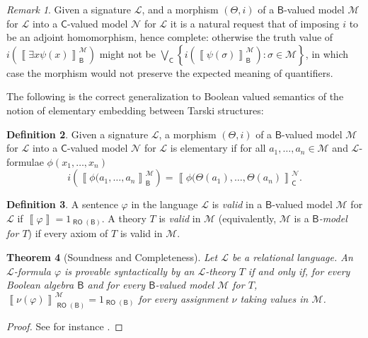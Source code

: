 \documentclass[11pt]{amsart}
\newcommand{\nphi}{\varphi}
\newcommand{\LL}{\mathcal{L}}
\theoremstyle{plain}
\newtheorem{theorem}{Theorem}[section]
\theoremstyle{definition}
\newtheorem{definition}[theorem]{Definition}
\theoremstyle{plain}
\theoremstyle{remark}
\newtheorem{remark}[theorem]{Remark}
\newcommand{\N}{\mathcal{N}}
\newcommand{\M}{\mathcal{M}}
\DeclareMathOperator{\RO}{\mathsf{RO}}
\newcommand{\bool}[1]{\mathsf{#1}}
\newcommand{\cp}[1]{\left( #1 \right)}
\newcommand{\Qp}[1]{\left\llbracket #1 \right\rrbracket}
\newcommand{\bp}[1]{\left\lbrace #1 \right\rbrace}
\newcommand{\0}{\mathsf{0}}
\renewcommand{\1}{\mathsf{1}}
\renewcommand{\2}{\mathsf{2}}
\theoremstyle{definition}
\begin{document}
\begin{remark}
Given a signature $\mathcal{L}$,
and a morphism $(\Theta,i)$ of a $\bool{B}$-valued model $\M$ for $\mathcal{L}$ into a $\bool{C}$-valued model $\N$ for $\mathcal{L}$
it is a natural request that of imposing $i$ to be an adjoint homomorphism, hence complete: otherwise the truth value of $i\cp{\Qp{\exists x\psi(x)}^\M_{\bool{B}}}$ might not be $\bigvee_{\bool{C}}\bp{i\cp{\Qp{\psi(\sigma)}^\M_\bool{B}}: \sigma\in\M}$, in which case the morphism would not preserve the expected meaning of quantifiers.
\end{remark}

The following is the correct generalization to Boolean valued semantics of the notion of elementary embedding between Tarski structures:
\begin{definition}\label{def:elembvm}
Given a signature $\mathcal{L}$,
a morphism $(\Theta,i)$ of a $\bool{B}$-valued model $\M$ for $\mathcal{L}$ into a $\bool{C}$-valued model $\N$
for $\mathcal{L}$ is elementary if for all $a_1,\dots,a_n\in\M$ and $\mathcal{L}$-formulae $\phi(x_1,\dots,x_n)$
\[
i(\Qp{\phi(a_1,\dots,a_n}^\M_\bool{B})=\Qp{\phi(\Theta(a_1),\dots,\Theta(a_n)}^\N_\bool{C}.
\]
\end{definition}


\begin{definition}
A sentence $\nphi$ in the language $\LL$ is \emph{valid} in a $\bool{B}$-valued model $\M$ for $\LL$ if $\Qp{\nphi}=1_{\RO(\bool{B})}$. 
A theory $T$ is \emph{valid} in $\M$ (equivalently, $\M$ is a \emph{$\bool{B}$-model for $T$}) if every axiom of $T$ is valid in $\M$.
\end{definition}
\begin{theorem}[Soundness and Completeness]
Let $\LL$ be a relational language. An $\LL$-formula $\nphi$ is provable syntactically by an $\LL$-theory $T$ if and only if, for every Boolean algebra $\bool{B}$ and for every $\bool{B}$-valued model $\M$ for $T$, $\Qp{\nu(\nphi)}^\M_{\RO(\bool{B})}=1_{\RO(\bool{B})}$ for every assignment $\nu$ taking values in $\M$.
\end{theorem}
\begin{proof}
See for instance \cite[Theorem 6.1.5]{viale-bookonforcing}.
\end{proof}



%
\end{document}
